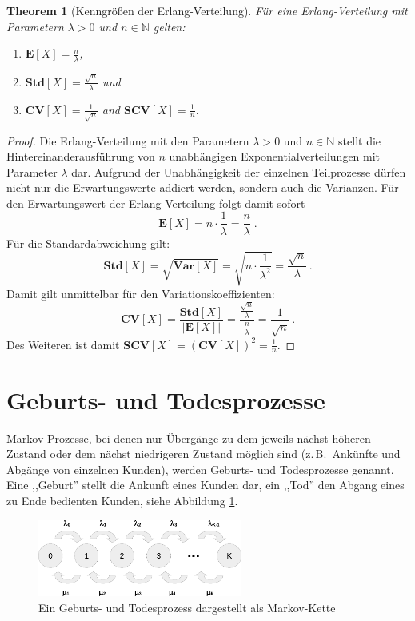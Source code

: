 \documentclass[a4paper,11pt,oneside]{article}
\newtheorem{theorem}{Theorem}
\theoremstyle{definition}
\begin{document}
\begin{theorem}[Kenngrößen der Erlang-Verteilung]
Für eine Erlang-Verteilung mit Parametern $\lambda>0$ und $n\in\mathbb{N}$ gelten:
\begin{enumerate}
\item $\mathbf{E}[X]=\frac{n}{\lambda}$,
\item $\mathbf{Std}[X]=\frac{\sqrt{n}}{\lambda}$ und
\item $\mathbf{CV}[X]=\frac{1}{\sqrt{n}}$ and $\mathbf{SCV}[X]=\frac{1}{n}$.
\end{enumerate}
\end{theorem}

\begin{proof}
Die Erlang-Verteilung mit den Parametern $\lambda>0$ und $n\in\mathbb{N}$ stellt die Hintereinanderausführung von $n$ unabhängigen Exponentialverteilungen mit Parameter $\lambda$ dar. Aufgrund der Unabhängigkeit der einzelnen Teilprozesse dürfen nicht nur die Erwartungswerte addiert werden, sondern auch die Varianzen. Für den Erwartungswert der Erlang-Verteilung folgt damit sofort
$$
{\mathbf E}[X]=n\cdot\frac{1}{\lambda}=\frac{n}{\lambda}\;.
$$
Für die Standardabweichung gilt:
$$
\mathbf{Std}[X]=\sqrt{\mathbf{Var}[X]}=\sqrt{n\cdot\frac{1}{\lambda^2}}=\frac{\sqrt{n}}{\lambda}\,.
$$
Damit gilt unmittelbar für den Variationskoeffizienten:
$$
\mathbf{CV}[X]=\frac{\mathbf{Std}[X]}{|{\mathbf E}[X]|}=\frac{\frac{\sqrt{n}}{\lambda}}{\frac{n}{\lambda}}=\frac{1}{\sqrt{n}}\,.
$$
Des Weiteren ist damit $\mathbf{SCV}[X]=\left(\mathbf{CV}[X]\right)^2=\frac{1}{n}$.
\end{proof}



\section{Geburts- und Todesprozesse}\label{BirthAndDeathProcesses}

Markov-Prozesse, bei denen nur Übergänge zu dem jeweils nächst höheren Zustand oder dem nächst niedrigeren Zustand möglich sind (z.\,B.\ Ankünfte und Abgänge von einzelnen Kunden), werden Geburts- und Todesprozesse genannt. Eine ,,Geburt'' stellt die Ankunft eines Kunden dar, ein ,,Tod'' den Abgang eines zu Ende bedienten Kunden, siehe Abbildung \ref{fig:BirthAndDEathProcess}.

\begin{figure}[H]
\begin{center}
\includegraphics[width=0.6\textwidth]{ProofOfTheErlangCFormula-MarkovChain.pdf}
\end{center}
\caption{Ein Geburts- und Todesprozess dargestellt als Markov-Kette}
\label{fig:BirthAndDEathProcess}
\end{figure}
\end{document}
